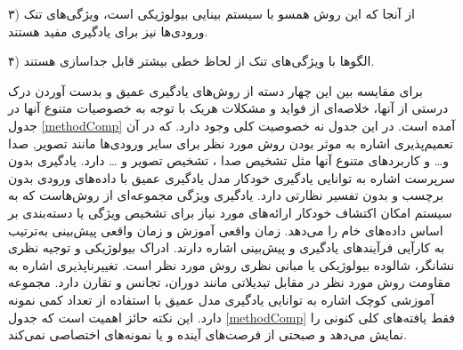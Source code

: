۳) از آنجا که این روش همسو با سیستم بینایی بیولوژیکی است، ویژگی‌های تنک ورودی‌ها نیز برای یادگیری مفید هستند.
   
۴) الگوها با ویژگی‌های تنک از لحاظ خطی بیشتر قابل جداسازی هستند.

برای مقایسه بین این چهار دسته از روش‌های یادگیری عمیق و بدست آوردن درک درستی از آنها، خلاصه‌ای از فواید و مشکلات هریک با توجه به خصوصیات متنوع آنها در جدول 
\ref{methodComp}
آمده است. در این جدول نه خصوصیت کلی وجود دارد. که در آن تعمیم‌پذیری 
اشاره به موثر بودن روش مورد نظر برای سایر ورودی‌ها مانند تصویر, صدا و… و کاربردهای متنوع آنها مثل تشخیص صدا
، 
تشخیص تصویر
و …  دارد.  یادگیری بدون سرپرست 
اشاره به توانایی یادگیری خودکار مدل یادگیری عمیق با داده‌های ورودی بدون برچسب و بدون تفسیر نظارتی دارد.  یادگیری ویژگی 
مجموعه‌ای از روش‌هاست که به سیستم امکان اکتشاف خودکار ارائه‌های مورد نیاز برای تشخیص ویژگی یا دسته‌بندی بر اساس داده‌های خام را می‌دهد. زمان واقعی آموزش 
و زمان واقعی پیش‌بینی  
به‌ترتیب به کارآیی فرآیندهای یادگیری و پیش‌بینی اشاره دارند. ادراک بیولوژیکی 
و توجیه نظری 
نشانگر، شالوده بیولوژیکی یا مبانی نظری روش مورد نظر است. تغییرناپذیری 
اشاره به مقاومت روش مورد نظر در مقابل تبدیلاتی مانند دوران، تجانس  و تقارن دارد. مجموعه آموزشی کوچک 
اشاره به توانایی یادگیری مدل عمیق با استفاده از تعداد کمی نمونه دارد. این نکته حائز اهمیت است که جدول 
\ref{methodComp} 
فقط یافته‌های کلی کنونی را نمایش می‌دهد و صبحتی از فرصت‌های آینده و یا نمونه‌های اختصاصی نمی‌کند. 


